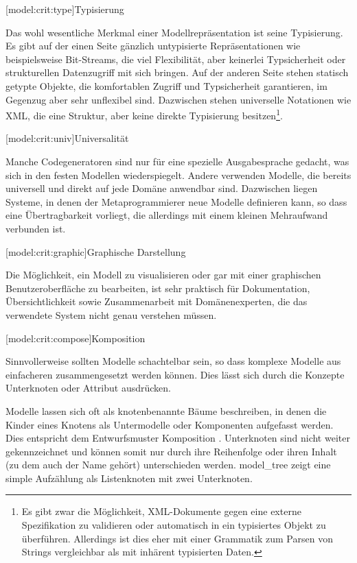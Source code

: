 \documentclass[11pt, a4paper, bibgerm]{scrbook}
\newcommand\lsubsection{}
\newcommand\abb{}
\begin{document}
\lsubsection[model:crit:type]{Typisierung}

Das wohl wesentliche Merkmal einer Modellrepräsentation ist seine
Typisierung. Es gibt auf der einen Seite gänzlich untypisierte
Repräsentationen wie beispielsweise Bit-Streams, die viel Flexibilität,
aber keinerlei Typsicherheit oder strukturellen Datenzugriff mit sich
bringen. Auf der anderen Seite stehen statisch getypte Objekte, die
komfortablen Zugriff und Typsicherheit garantieren, im Gegenzug aber
sehr unflexibel sind. Dazwischen stehen universelle Notationen wie XML,
die eine Struktur, aber keine direkte Typisierung besitzen\footnote{Es
  gibt zwar die Möglichkeit, XML-Dokumente gegen eine externe
  Spezifikation zu validieren oder automatisch in ein typisiertes Objekt
zu überführen. Allerdings ist dies eher mit einer Grammatik
zum Parsen von Strings vergleichbar als mit inhärent typisierten Daten.}.

\lsubsection[model:crit:univ]{Universalität} 

Manche Codegeneratoren sind nur für eine spezielle Ausgabesprache
gedacht, was sich in den festen Modellen wiederspiegelt. Andere
verwenden Modelle, die bereits universell und direkt auf jede Domäne
anwendbar sind. Dazwischen liegen Systeme, in denen der
Metaprogrammierer neue Modelle definieren kann, so dass eine
Übertragbarkeit vorliegt, die allerdings mit einem kleinen Mehraufwand
verbunden ist.

\lsubsection[model:crit:graphic]{Graphische Darstellung}

Die Möglichkeit, ein Modell zu visualisieren oder gar mit einer
graphischen Benutzeroberfläche zu bearbeiten, ist sehr praktisch für
Dokumentation, Übersichtlichkeit sowie Zusammenarbeit mit
Domänenexperten, die das verwendete System nicht genau verstehen müssen.

\lsubsection[model:crit:compose]{Komposition}

Sinnvollerweise sollten Modelle schachtelbar sein, so dass
komplexe Modelle aus einfacheren zusammengesetzt werden können.
Dies lässt sich durch die Konzepte Unterknoten oder Attribut ausdrücken.

Modelle lassen sich oft als knotenbenannte Bäume beschreiben, in denen
die Kinder eines Knotens als Untermodelle oder Komponenten aufgefasst
werden. Dies entspricht dem Entwurfsmuster
Komposition \cite[S.182f]{CompositePattern}. Unterknoten sind nicht
weiter gekennzeichnet und können somit nur durch ihre Reihenfolge oder
ihren Inhalt (zu dem auch der Name gehört) unterschieden
werden. \abb{model_tree} zeigt eine simple Aufzählung als
Listenknoten mit zwei Unterknoten.
\end{document}
